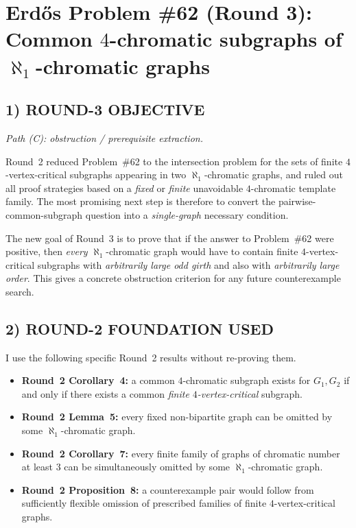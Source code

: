 \section{Erd\H{o}s Problem \#62 (Round 3): Common $4$-chromatic subgraphs of $\aleph_1$-chromatic graphs}

\subsection*{1) ROUND-3 OBJECTIVE}
\emph{Path (C): obstruction / prerequisite extraction.}

Round~2 reduced Problem~\#62 to the intersection problem for the sets of finite $4$-vertex-critical subgraphs appearing in two $\aleph_1$-chromatic graphs, and ruled out all proof strategies based on a \emph{fixed} or \emph{finite} unavoidable $4$-chromatic template family. The most promising next step is therefore to convert the pairwise-common-subgraph question into a \emph{single-graph} necessary condition.

The new goal of Round~3 is to prove that if the answer to Problem~\#62 were positive, then \emph{every} $\aleph_1$-chromatic graph would have to contain finite $4$-vertex-critical subgraphs with \emph{arbitrarily large odd girth} and also with \emph{arbitrarily large order}. This gives a concrete obstruction criterion for any future counterexample search.

\subsection*{2) ROUND-2 FOUNDATION USED}
I use the following specific Round~2 results without re-proving them.
\begin{itemize}
\item \textbf{Round~2 Corollary~4:} a common $4$-chromatic subgraph exists for $G_1,G_2$ if and only if there exists a common \emph{finite $4$-vertex-critical} subgraph.
\item \textbf{Round~2 Lemma~5:} every fixed non-bipartite graph can be omitted by some $\aleph_1$-chromatic graph.
\item \textbf{Round~2 Corollary~7:} every finite family of graphs of chromatic number at least $3$ can be simultaneously omitted by some $\aleph_1$-chromatic graph.
\item \textbf{Round~2 Proposition~8:} a counterexample pair would follow from sufficiently flexible omission of prescribed families of finite $4$-vertex-critical graphs.
\end{itemize}

